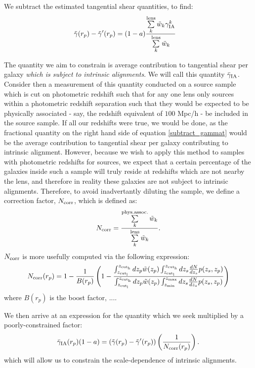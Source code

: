 \documentclass[a4paper,fleqn,usenatbib,useAMS]{mnras}
\begin{document}
We subtract the estimated tangential shear quantities, to find:
\begin{align}
\tilde{\gamma}(r_p) - \tilde{\gamma}^\prime(r_p) &= (1-a) \frac{\sum\limits_{k}^{\rm lens} \tilde{w}_k \gamma_{\rm IA}^k}{\sum\limits_{k}^{\rm lens} \tilde{w}_k} 
\label{subtract_gammat}
\end{align}

The quantity we aim to constrain is average contribution to tangential shear per galaxy {\it which is subject to intrinsic alignments}. We will call this quantity $\bar{\gamma}_{\rm IA}$. Consider then a measurement of this quantity conducted on a source sample which is cut on photometric redshift such that for any one lens only sources within a photometric redshift separation such that they would be expected to be physically associated - say, the redshift equivalent of $100$ Mpc/h - be included in the source sample. If all our redshifts were true, we would be done, as the fractional quantity on the right hand side of equation \ref{subtract_gammat} would be the average contribution to tangential shear per galaxy contributing to intrinsic alignment. However, because we wish to apply this method to samples with photometric redshifts for sources, we expect that a certain percentage of the galaxies inside such a sample will truly reside at redshifts which are not nearby the lens, and therefore in reality these galaxies are not subject to intrinsic alignments. Therefore, to avoid inadvertantly diluting the sample, we define a correction factor, $N_{\rm corr}$, which is defined as:
\begin{equation}
N_{\rm corr} = \frac{\sum\limits_{k}^{\rm phys. assoc.} \tilde{w}_k}{\sum\limits_{k}^{\rm lens} \tilde{w}_k}.
\label{Ncorr1}
\end{equation}
$N_{\rm corr}$ is more usefully computed via the following expression:
\begin{equation}
N_{\rm corr}(r_p) = 1 - \frac{1}{B(r_p)}\left(1 - \frac{\int_{z_{\rm cut_l}}^{z_{\rm cut_h}} dz_p \tilde{w}(z_p) \int_{z_{\rm cut_l}}^{z_{\rm cut_h}} dz_s\frac{dN}{dz_s} p(z_s, z_p)}{\int_{z_{\rm cut_l}}^{z_{\rm cut_h}} dz_p  \tilde{w}(z_p) \int_{z_{\rm min}}^{z_{\rm max}} dz_s\frac{dN}{dz_s} p(z_s, z_p)} \right)
\label{ncorr_2}
\end{equation}
where $B(r_p)$ is the boost factor, .... 

We then arrive at an expression for the quantity which we seek multiplied by a poorly-constrained factor:
\begin{equation}
\bar{\gamma}_{\rm IA}(r_p)(1-a) = \left(\tilde{\gamma}(r_p) - \tilde{\gamma}^\prime(r_p)\right)\left(\frac{1}{N_{\rm corr}(r_p)}\right).
\label{IAsol1}
\end{equation}
which will allow us to constrain the scale-dependence of intrinsic alignments.
\end{document}
